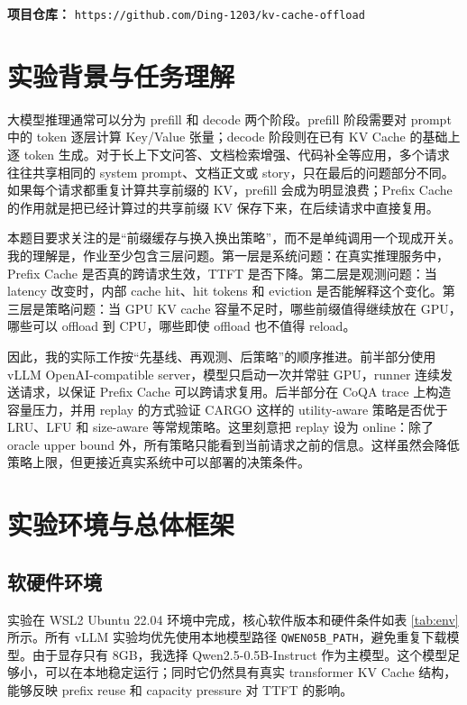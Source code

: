 \documentclass[UTF8,a4paper,10pt]{ctexart}
\begin{document}
\textbf{项目仓库：} \texttt{https://github.com/Ding-1203/kv-cache-offload}

\section{实验背景与任务理解}

大模型推理通常可以分为 prefill 和 decode 两个阶段。prefill 阶段需要对 prompt 中的 token 逐层计算 Key/Value 张量；decode 阶段则在已有 KV Cache 的基础上逐 token 生成。对于长上下文问答、文档检索增强、代码补全等应用，多个请求往往共享相同的 system prompt、文档正文或 story，只在最后的问题部分不同。如果每个请求都重复计算共享前缀的 KV，prefill 会成为明显浪费；Prefix Cache 的作用就是把已经计算过的共享前缀 KV 保存下来，在后续请求中直接复用。

本题目要求关注的是“前缀缓存与换入换出策略”，而不是单纯调用一个现成开关。我的理解是，作业至少包含三层问题。第一层是系统问题：在真实推理服务中，Prefix Cache 是否真的跨请求生效，TTFT 是否下降。第二层是观测问题：当 latency 改变时，内部 cache hit、hit tokens 和 eviction 是否能解释这个变化。第三层是策略问题：当 GPU KV cache 容量不足时，哪些前缀值得继续放在 GPU，哪些可以 offload 到 CPU，哪些即使 offload 也不值得 reload。

因此，我的实际工作按“先基线、再观测、后策略”的顺序推进。前半部分使用 vLLM OpenAI-compatible server，模型只启动一次并常驻 GPU，runner 连续发送请求，以保证 Prefix Cache 可以跨请求复用。后半部分在 CoQA trace 上构造容量压力，并用 replay 的方式验证 CARGO 这样的 utility-aware 策略是否优于 LRU、LFU 和 size-aware 等常规策略。这里刻意把 replay 设为 online：除了 oracle upper bound 外，所有策略只能看到当前请求之前的信息。这样虽然会降低策略上限，但更接近真实系统中可以部署的决策条件。

\section{实验环境与总体框架}

\subsection{软硬件环境}

实验在 WSL2 Ubuntu 22.04 环境中完成，核心软件版本和硬件条件如表 \ref{tab:env} 所示。所有 vLLM 实验均优先使用本地模型路径 \texttt{QWEN05B\_PATH}，避免重复下载模型。由于显存只有 8GB，我选择 Qwen2.5-0.5B-Instruct 作为主模型。这个模型足够小，可以在本地稳定运行；同时它仍然具有真实 transformer KV Cache 结构，能够反映 prefix reuse 和 capacity pressure 对 TTFT 的影响。
\end{document}

